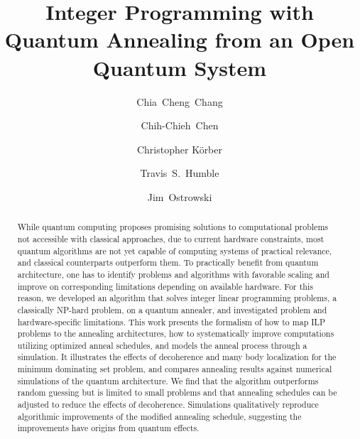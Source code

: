 \documentclass[prd,twocolumn,tightenlines,preprintnumbers,showpacs,superscriptaddress,notitlepage,nofootinbib,eqsecnum,floatfix,longbibliography,aps,10pt]{revtex4-1}
\begin{document}
\title{Integer Programming with Quantum Annealing from an Open Quantum System}

\author{Chia~Cheng~Chang}
	\author{Chih-Chieh~Chen }
\author{Christopher K\"orber}
\author{Travis~S.~Humble}
\author{Jim~Ostrowski}

\newcommand{\alert}[1]{\textbf{\color{red}{#1}}}
\renewcommand{\vec}[1]{\boldsymbol{#1}}

\newcommand{\ghissue}[2]{
 \noindent\fbox{\parbox{0.49\textwidth}{
   \alert{[#1]}%
   \\%
   \href{https://github.com/cchang5/quantum\_linear\_programming/pull/#2}{See GitHub issue #2}}%
 }
}


\begin{abstract}
 While quantum computing proposes promising solutions to computational problems not accessible with classical approaches, due to current hardware constraints, most quantum algorithms are not yet capable of computing systems of practical relevance, and classical counterparts outperform them.
 To practically benefit from quantum architecture, one has to identify problems and algorithms with favorable scaling and improve on corresponding limitations depending on available hardware.
 For this reason, we developed an algorithm that solves integer linear programming problems, a classically NP-hard problem, on a quantum annealer, and investigated problem and hardware-specific limitations.
 This work presents the formalism of how to map ILP problems to the annealing architectures, how to systematically improve computations utilizing optimized anneal schedules, and models the anneal process through a simulation.
 It illustrates the effects of decoherence and many body localization for the minimum dominating set problem, and compares annealing results against numerical simulations of the quantum architecture.
 We find that the algorithm outperforms random guessing but is limited to small problems and that annealing schedules can be adjusted to reduce the effects of decoherence.
 Simulations qualitatively reproduce algorithmic improvements of the modified annealing schedule, suggesting the improvements have origins from quantum effects.
\end{abstract}
\end{document}
